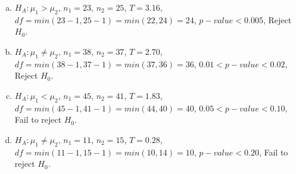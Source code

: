 {
\begin{enumerate}[(a)]
\setlength{\itemsep}{0mm}
\item $H_A: \mu_1 > \mu_2$, $n_1 = 23$, $n_2 = 25$, $T = 3.16$, $df = min(23 - 1, 25 - 1) = min(22, 24) = 24$, $p-value < 0.005$, Reject $H_0$.
\item $H_A: \mu_1 \ne \mu_2$, $n_1 = 38$,  $n_2 = 37$, $T = 2.70$, $df = min(38 - 1, 37 - 1) = min(37, 36) = 36$, $0.01 < p-value < 0.02$, Reject $H_0$.
\item $H_A: \mu_1 < \mu_2$, $n_1 = 45$,  $n_2 = 41$, $T = 1.83$, $df = min(45 - 1, 41 - 1) = min(44, 40) = 40$, $0.05 < p-value < 0.10$, Fail to reject $H_0$.
\item $H_A: \mu_1 \ne \mu_2$, $n_1 = 11$,  $n_2 = 15$, $T = 0.28$, $df = min(11 - 1, 15 - 1) = min(10, 14) = 10$, $p-value < 0.20$, Fail to reject $H_0$.
\end{enumerate}
}


